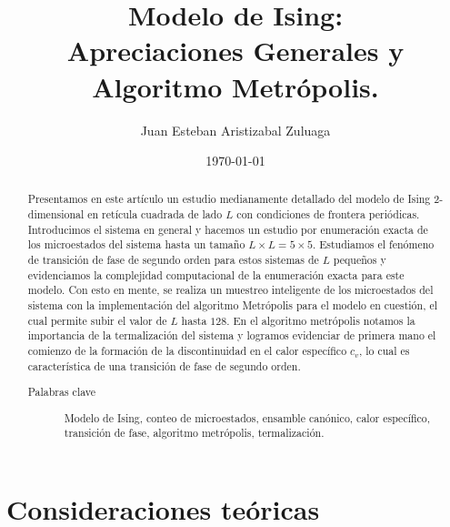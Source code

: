 \documentclass[%
 reprint,
 amsmath,amssymb,
 aps,
 pra,
]{revtex4-2}
\begin{document}

\title{Modelo de Ising:\texorpdfstring{\\}{ }Apreciaciones Generales y Algoritmo Metrópolis.}%

\author{Juan Esteban Aristizabal Zuluaga}

\date{\today}%

\begin{abstract}
Presentamos en este artículo un estudio medianamente detallado del modelo de Ising 2-dimensional en retícula cuadrada de lado $L$ con condiciones de frontera periódicas. Introducimos el sistema en general y hacemos un estudio por enumeración exacta de los microestados del sistema hasta un tamaño $L \times L = 5 \times 5$. Estudiamos el fenómeno de transición de fase de segundo orden para estos sistemas de $L$ pequeños y evidenciamos la complejidad computacional de la enumeración exacta para este modelo. Con esto en mente, se realiza un muestreo inteligente de los microestados del sistema con la implementación del algoritmo Metrópolis para el modelo en cuestión, el cual permite subir el valor de $L$ hasta $128$. En el algoritmo metrópolis notamos la importancia de la termalización del sistema y logramos evidenciar de primera mano el comienzo de la formación de la discontinuidad en el calor específico $c_v$, lo cual es característica de una transición de fase de segundo orden. 
\begin{description}
\item[Palabras clave] Modelo de Ising, conteo de microestados, ensamble canónico, calor específico,\\transición de fase, algoritmo metrópolis, termalización.
\end{description}
\end{abstract}

\maketitle

\onecolumngrid

\section{Consideraciones teóricas\label{sec:teoria-microestados}}
\end{document}

